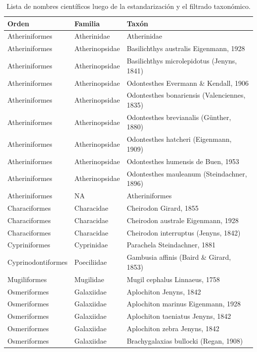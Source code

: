\documentclass[sn-apa,pdflatex]{sn-jnl}
\begin{document}
\begin{longtable}[t]{>{\raggedright\arraybackslash}p{10em}>{\raggedright\arraybackslash}p{10em}>{\raggedright\arraybackslash}p{28em}}
\caption{\label{tab:taxainarea}Lista de nombres científicos luego de la estandarización y el filtrado taxonómico.}\\
\toprule
Orden & Familia & Taxón\\
\midrule
Atheriniformes & Atherinidae & Atherinidae\\
Atheriniformes & Atherinopsidae & Basilichthys australis Eigenmann, 1928\\
Atheriniformes & Atherinopsidae & Basilichthys microlepidotus (Jenyns, 1841)\\
Atheriniformes & Atherinopsidae & Odontesthes Evermann \& Kendall, 1906\\
Atheriniformes & Atherinopsidae & Odontesthes bonariensis (Valenciennes, 1835)\\
\addlinespace
Atheriniformes & Atherinopsidae & Odontesthes brevianalis (Günther, 1880)\\
Atheriniformes & Atherinopsidae & Odontesthes hatcheri (Eigenmann, 1909)\\
Atheriniformes & Atherinopsidae & Odontesthes humensis de Buen, 1953\\
Atheriniformes & Atherinopsidae & Odontesthes mauleanum (Steindachner, 1896)\\
Atheriniformes & NA & Atheriniformes\\
\addlinespace
Characiformes & Characidae & Cheirodon Girard, 1855\\
Characiformes & Characidae & Cheirodon australe Eigenmann, 1928\\
Characiformes & Characidae & Cheirodon interruptus (Jenyns, 1842)\\
Cypriniformes & Cyprinidae & Parachela Steindachner, 1881\\
Cyprinodontiformes & Poeciliidae & Gambusia affinis (Baird \& Girard, 1853)\\
\addlinespace
Mugiliformes & Mugilidae & Mugil cephalus Linnaeus, 1758\\
Osmeriformes & Galaxiidae & Aplochiton Jenyns, 1842\\
Osmeriformes & Galaxiidae & Aplochiton marinus Eigenmann, 1928\\
Osmeriformes & Galaxiidae & Aplochiton taeniatus Jenyns, 1842\\
Osmeriformes & Galaxiidae & Aplochiton zebra Jenyns, 1842\\
\addlinespace
Osmeriformes & Galaxiidae & Brachygalaxias bullocki (Regan, 1908)\\

\end{longtable}
\end{document}
